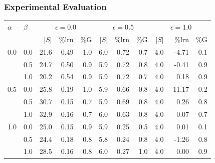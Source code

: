 \documentclass{beamer}
\begin{document}
\begin{frame}
\frametitle{Experimental Evaluation}

\begin{table}[t]\footnotesize
\centering
\def\toprule{\hline}
\def\midrule{\hline\hline}
\def\bottomrule{\hline}
\tabcolsep=3pt
\begin{tabular}{|l|l|r|r|r|r|r|r|r|r|r|}
\toprule
$\alpha$ & $\beta$ & 
\multicolumn{3}{|c|}{$\epsilon=0.0$} & 
\multicolumn{3}{|c|}{$\epsilon=0.5$} & 
\multicolumn{3}{|c|}{$\epsilon=1.0$} \\  \cline{3-11}
& & $|S|$ & \%lrn & \%G & 
$|S|$ & \%lrn & \%G & 
$|S|$ & \%lrn & \%G \\ \midrule
0.0 & 0.0 &          21.6 &        0.49 &           1.0 & 
                      6.0 &        0.72 &           0.7 & 
                      4.0 &       -4.71 &           0.1 \\
    & 0.5 &          24.7 &        0.50 &           0.9 & 
                      5.9 &        0.72 &           0.8 & 
                      4.0 &       -0.41 &           0.9 \\
    & 1.0 &          20.2 &        0.54 &           0.9 & 
                      5.9 &        0.72 &           0.7 & 
                      4.0 &        0.18 &           0.9 \\ 
0.5 & 0.0 &          25.8 &        0.19 &           1.0 & 
                      5.9 &        0.66 &           0.8 & 
                      4.0 &      -11.17 &           0.2 \\
    & 0.5 &          30.7 &        0.15 &           0.7 & 
                      5.9 &        0.69 &           0.8 & 
                      4.0 &        0.26 &           0.8 \\
    & 1.0 &          32.9 &        0.16 &           0.7 & 
                      6.0 &        0.63 &           0.8 & 
                      4.0 &        0.07 &           0.7 \\
1.0 & 0.0 &          25.0 &        0.15 &           0.9 & 
                      5.9 &        0.25 &           0.5 & 
                      4.0 &        0.01 &           0.1 \\
    & 0.5 &          24.4 &        0.18 &           0.8 & 
                      5.8 &        0.24 &           0.8 & 
                      4.0 &       -1.26 &           0.8 \\
    & 1.0 &          28.5 &        0.16 &           0.8 & 
                     6.0 &        0.27 &           1.0 & 
                      4.0 &        0.00 &           0.9 \\
\bottomrule
\end{tabular}
\end{table}


\end{frame}
\end{document}
